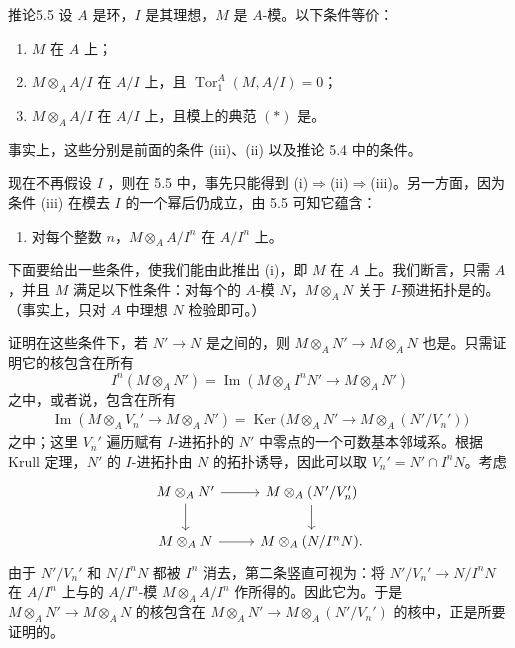 \begin{SGAresult}{推论}{5.5}
设 $A$ 是环，$I$ 是其理想，$M$ 是 $A$-模。以下条件等价：
\begin{enumerate}
\item[(i)] $M$ 在 $A$ 上；
\item[(ii)] $M\otimes_A A/I$ 在 $A/I$ 上，且 $\operatorname{Tor}_1^A(M,A/I)=0$；
\item[(iii)] $M\otimes_A A/I$ 在 $A/I$ 上，且模上的典范 $(*)$ 是。
\end{enumerate}
\end{SGAresult}
事实上，这些分别是前面的条件 (iii)、(ii) 以及推论 5.4 中的条件。

现在不再假设 $I$ ，则在 5.5 中，事先只能得到 (i)$\Rightarrow$(ii)$\Rightarrow$(iii)。另一方面，因为条件 (iii) 在模去 $I$ 的一个幂后仍成立，由 5.5 可知它蕴含：
\begin{enumerate}
\item[(iv)] 对每个整数 $n$，$M\otimes_A A/I^n$ 在 $A/I^n$ 上。
\end{enumerate}

下面要给出一些条件，使我们能由此推出 (i)，即 $M$ 在 $A$ 上。我们断言，只需 $A$ ，并且 $M$ 满足以下性条件：对每个的 $A$-模 $N$，$M\otimes_A N$ 关于 $I$-预进拓扑是的。（事实上，只对 $A$ 中理想 $N$ 检验即可。）

证明在这些条件下，若 $N'\to N$ 是之间的，则 $M\otimes_A N'\to M\otimes_A N$ 也是。只需证明它的核包含在所有
\[
I^n(M\otimes_A N')
=\operatorname{Im}(M\otimes_A I^nN'\longrightarrow M\otimes_A N')
\]
之中，或者说，包含在所有
\[
\begin{aligned}
\operatorname{Im}(M\otimes_A V_n'\longrightarrow M\otimes_A N')
=\operatorname{Ker}\bigl(M\otimes_A N'\longrightarrow M\otimes_A(N'/V_n')\bigr)
\end{aligned}
\]
之中；这里 $V_n'$ 遍历赋有 $I$-进拓扑的 $N'$ 中零点的一个可数基本邻域系。根据 Krull 定理，$N'$ 的 $I$-进拓扑由 $N$ 的拓扑诱导，因此可以取 $V_n'=N'\cap I^nN$。考虑
\[
\begin{tikzcd}
M\otimes_A N'\arrow[r]\arrow[d] & M\otimes_A(N'/V_n')\arrow[d]\\
M\otimes_A N\arrow[r] & M\otimes_A(N/I^nN).
\end{tikzcd}
\]
由于 $N'/V_n'$ 和 $N/I^nN$ 都被 $I^n$ 消去，第二条竖直可视为：将 $N'/V_n'\to N/I^nN$ 在 $A/I^n$ 上与的 $A/I^n$-模 $M\otimes_A A/I^n$ 作所得的。因此它为。于是 $M\otimes_A N'\to M\otimes_A N$ 的核包含在 $M\otimes_A N'\to M\otimes_A(N'/V_n')$ 的核中，正是所要证明的。

